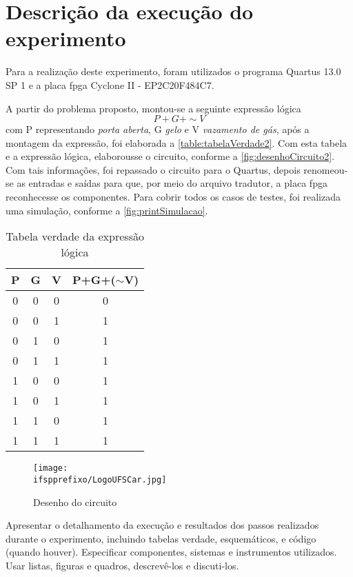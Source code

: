 
\chapter{Descrição da execução do experimento}
Para a realização deste experimento, foram utilizados o programa Quartus 13.0 SP 1 e a placa \ac{fpga} Cyclone II - EP2C20F484C7.

A partir do problema proposto, montou-se a seguinte expressão lógica
$$ P + G + \sim V$$
com P representando \textit{porta aberta}, G \textit{gelo} e V \textit{vazamento de gás}, após a
montagem da expressão, foi elaborada a \autoref{table:tabelaVerdade2}. Com esta tabela e a expressão lógica,
elaborousse o circuito, conforme a \autoref{fig:desenhoCircuito2}. Com tais informações, foi repassado o circuito
para o Quartus, depois renomeou-se as entradas e saídas para que, por meio do arquivo tradutor, a placa
\ac{fpga} reconhecesse os componentes.
Para cobrir todos os casos de testes, foi realizada uma simulação, conforme a \autoref{fig:printSimulacao}.

\begin{table}[h]
	\centering
	\caption{Tabela verdade da expressão lógica}\label{table:tabelaVerdade2}
	\begin{tabular}{c|c|c|c}
		\textbf{P} & \textbf{G} & \textbf{V} & \textbf{P+G+($\sim$V)} \\
		\hline
		0 & 0 & 0 & 0\\\hline
		0 & 0 & 1 & 1\\\hline
		0 & 1 & 0 & 1\\\hline
		0 & 1 & 1 & 1\\\hline
		1 & 0 & 0 & 1\\\hline
		1 & 0 & 1 & 1\\\hline
		1 & 1 & 0 & 1\\\hline
		1 & 1 & 1 & 1
	\end{tabular}
\end{table}

\begin{figure}[htb]
    \centering
	\caption{\label{fig:desenhoCircuito2}Desenho do circuito}
	\texttt{[image: \\ifspprefixo/LogoUFSCar.jpg]}
\end{figure}


Apresentar   o   detalhamento   da  execução  e   resultados   dos   passos   realizados
durante   o   experimento,   incluindo   tabelas   verdade,   esquemáticos,   e   código
(quando  houver).
Especificar  componentes,  sistemas  e  instrumentos  utilizados.
Usar listas, figuras e quadros, descrevê-los e discuti-los.



